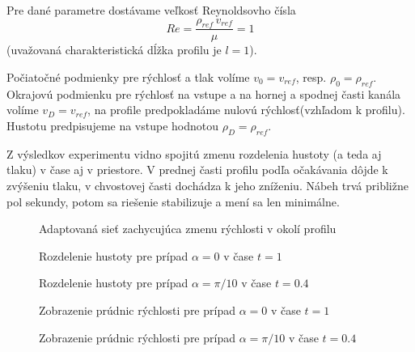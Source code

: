 Pre dané parametre dostávame veľkosť Reynoldsovho čísla
$$Re=\frac{\rho_{ref}\,v_{ref}}{\mu} = 1$$ (uvažovaná charakteristická dĺžka
profilu je $l=1$).  


Počiatočné podmienky pre rýchlosť a tlak volíme $v_0=v_{ref}$, resp.
$\rho_0=\rho_{ref}$. Okrajovú podmienku pre rýchlosť na vstupe a na hornej a
spodnej časti kanála volíme $v_D=v_{ref}$, na profile predpokladáme nulovú
rýchlosť(vzhľadom k profilu). Hustotu predpisujeme na vstupe hodnotou $\rho_D=\rho_{ref}$. 


Z výsledkov experimentu vidno spojitú zmenu rozdelenia hustoty (a teda aj tlaku) v
čase aj v priestore. V prednej časti profilu podľa očakávania dôjde k zvýšeniu
tlaku, v chvostovej časti dochádza k jeho zníženiu. Nábeh trvá približne pol
sekundy, potom sa riešenie stabilizuje a mení sa len minimálne.

\begin{figure}[h]
  \begin{center}
    \caption{Adaptovaná sieť zachycujúca zmenu rýchlosti v okolí profilu}
    \label{si-im-mesh-adapt}
  \end{center}
\end{figure}

\begin{figure}[h]
  \begin{center}
    \caption{Rozdelenie hustoty pre prípad $\alpha=0$ v čase $t=1$}
    \label{si-im-hustota1}
  \end{center}
\end{figure}

\begin{figure}[h]
  \begin{center}
    \caption{Rozdelenie hustoty pre prípad $\alpha=\pi/10$ v čase $t=0.4$}
    \label{si-im-hustota2}
  \end{center}
\end{figure}

\begin{figure}[h]
  \begin{center}
    \caption{Zobrazenie prúdnic rýchlosti pre prípad $\alpha=0$ v čase $t=1$}
    \label{si-im-prudnice1}
  \end{center}
\end{figure}

\begin{figure}[h]
  \begin{center}
    \caption{Zobrazenie prúdnic rýchlosti pre prípad $\alpha=\pi/10$ v čase $t=0.4$}
    \label{si-im-prudnice2}
  \end{center}
\end{figure}

